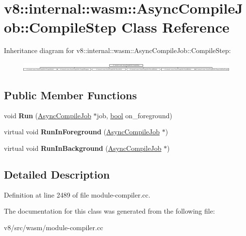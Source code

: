 \hypertarget{classv8_1_1internal_1_1wasm_1_1AsyncCompileJob_1_1CompileStep}{}\section{v8\+:\+:internal\+:\+:wasm\+:\+:Async\+Compile\+Job\+:\+:Compile\+Step Class Reference}
\label{classv8_1_1internal_1_1wasm_1_1AsyncCompileJob_1_1CompileStep}
Inheritance diagram for v8\+:\+:internal\+:\+:wasm\+:\+:Async\+Compile\+Job\+:\+:Compile\+Step\+:\begin{figure}[H]
\begin{center}
\leavevmode
\includegraphics[height=0.500447cm]{classv8_1_1internal_1_1wasm_1_1AsyncCompileJob_1_1CompileStep}
\end{center}
\end{figure}
\subsection*{Public Member Functions}
\begin{DoxyCompactItemize}
\item 
\mbox{\label{classv8_1_1internal_1_1wasm_1_1AsyncCompileJob_1_1CompileStep_abfcaead40f2f15dbf84cee35a2f02623}} 
void {\bfseries Run} (\mbox{\hyperlink{classv8_1_1internal_1_1wasm_1_1AsyncCompileJob}{Async\+Compile\+Job}} $\ast$job, \mbox{\hyperlink{classbool}{bool}} on\+\_\+foreground)
\item 
\mbox{\label{classv8_1_1internal_1_1wasm_1_1AsyncCompileJob_1_1CompileStep_ad5029dd7594af476720c9304999a85bf}} 
virtual void {\bfseries Run\+In\+Foreground} (\mbox{\hyperlink{classv8_1_1internal_1_1wasm_1_1AsyncCompileJob}{Async\+Compile\+Job}} $\ast$)
\item 
\mbox{\label{classv8_1_1internal_1_1wasm_1_1AsyncCompileJob_1_1CompileStep_a97ba94766f9dd48e4c3f3685904eff16}} 
virtual void {\bfseries Run\+In\+Background} (\mbox{\hyperlink{classv8_1_1internal_1_1wasm_1_1AsyncCompileJob}{Async\+Compile\+Job}} $\ast$)
\end{DoxyCompactItemize}


\subsection{Detailed Description}


Definition at line 2489 of file module-\/compiler.\+cc.



The documentation for this class was generated from the following file\+:\begin{DoxyCompactItemize}
\item 
v8/src/wasm/module-\/compiler.\+cc\end{DoxyCompactItemize}
